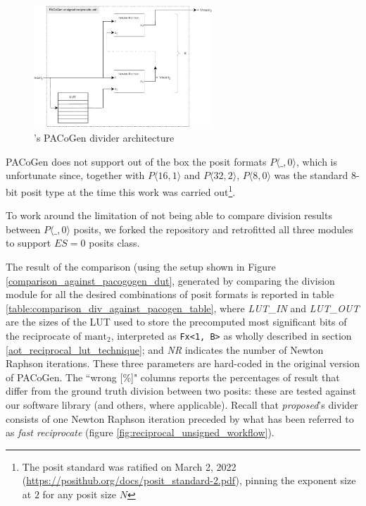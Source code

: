 \begin{figure}
    \centering
    \includegraphics[width=0.6\textwidth]{figures/div_pacogen_architecture.pdf}
    \caption{\cite{PACoGen}'s PACoGen divider architecture}
    \label{fig:pacoge_divider_architecture}
\end{figure}


PACoGen does not support out of the box the posit formats $P\langle\_, 0\rangle$, which is unfortunate since, together with $P\langle16, 1\rangle$ and $P\langle32, 2\rangle$, $P\langle8, 0\rangle$ was the standard $8$-bit posit type at the time this work was carried out\footnote{The posit standard was ratified on March 2, 2022 (\url{https://posithub.org/docs/posit_standard-2.pdf}), pinning the exponent size at $2$ for any posit size $N$}.

To work around the limitation of not being able to compare division results between $P\langle\_, 0\rangle$ posits, we forked the repository and retrofitted all three modules to support $ES = 0$ posits class.


The result of the comparison (using the setup shown in Figure \ref{comparison_against_pacogogen_dut}, generated by comparing the division module
for all the desired combinations of posit formats is reported in table \ref{table:comparison_div_against_pacogen_table}, where \textit{LUT\_IN} and \textit{LUT\_OUT} are the sizes of the LUT used to store the precomputed most significant bits of the reciprocate of $\text{mant}_2$, interpreted as \texttt{Fx<1, B>} as wholly described in section \ref{aot_reciprocal_lut_technique}; and \textit{NR} indicates the number of Newton Raphson iterations. These three parameters are hard-coded in the original version of PACoGen.
The ``wrong [\%]" columns reports the percentages of result that differ from the ground truth division between two posits: these are tested against our software library (and others, where applicable).
Recall that \textit{proposed}'s divider consists of one Newton Raphson iteration preceded by what has been referred to as \textit{fast reciprocate} (figure \ref{fig:reciprocal_unsigned_workflow}).


